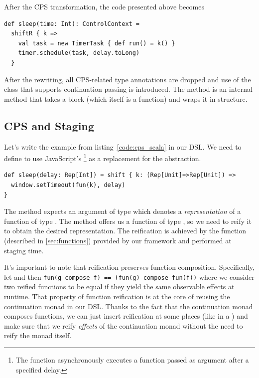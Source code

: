 \documentclass[runningheads,a4paper]{llncs}
\begin{document}
After the CPS transformation, the code presented above becomes
\begin{lstlisting}
def sleep(time: Int): ControlContext =
  shiftR { k =>
    val task = new TimerTask { def run() = k() }
    timer.schedule(task, delay.toLong)
  }
\end{lstlisting}

After the rewriting, all CPS-related type annotations are dropped and use of the  class that supports continuation passing is introduced. The  method is an internal method that takes a block (which itself is a function) and wraps it in  structure.

\subsection{CPS and Staging}
Let's write the example from listing~\ref{code:cps_scala} in our DSL. We need to define  to use JavaScript's 
\footnote{The  function asynchronously executes a function passed as argument after a specified delay.}
as a replacement for the  abstraction.
\begin{lstlisting}
def sleep(delay: Rep[Int]) = shift { k: (Rep[Unit]=>Rep[Unit]) =>
  window.setTimeout(fun(k), delay)
}
\end{lstlisting}

The  method expects an argument of type  which denotes a \emph{representation} of a function of type . The  method offers us a function of type , so we need to reify it to obtain the desired representation. The reification is achieved by the  function (described in \ref{sec:functions}) provided by our framework and performed at staging time.

It's important to note that reification preserves function composition. Specifically, let  and  then {\tt\small fun(g compose f) == (fun(g) compose fun(f))} where we consider two reified functions to be equal if they yield the same observable effects at runtime. That property of function reification is at the core of reusing the continuation monad in our DSL. Thanks to the fact that the continuation monad composes functions, we can just insert reification at some places (like in a ) and make sure that we reify \emph{effects} of the continuation monad without the need to reify the monad itself.
\end{document}
